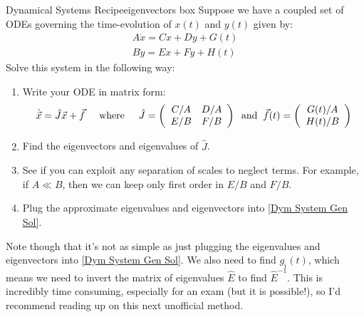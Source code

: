\begin{fact}{Dynamical Systems Recipe}{eigenvectors box}\label{eigenvectors box}
    Suppose we have a coupled set of ODEs governing the time-evolution of $x(t)$ and $y(t)$ given by:
    \begin{align*}
        A \dot{x}= Cx + Dy + G(t)\\
        B \dot{y} = Ex + Fy + H(t)
    \end{align*}
    Solve this system in the following way:
    \begin{enumerate}
        \item Write your ODE in matrix form:
            \begin{align*}
                \dot{\vec{x}}=\hat{J}\vec{x}+\vec{f} \hspace{5 mm}\text{where} \hspace{5 mm}\hat{J} = \left( \begin{array}{cc}
                    C/A & D/A \\
                    E/B & F/B
                \end{array} \right)
                \hspace{2 mm}\text{and} \hspace{2 mm}
                \vec{f}(t)=\left( \begin{array}{c}
                    G(t)/A \\
                    H(t)/B
                \end{array} \right)
            \end{align*}
        \item Find the eigenvectors and eigenvalues of $\hat{J}$.
        \item See if you can exploit any separation of scales to neglect terms. For example, if $A\ll B$, then we can keep only first order in $E/B$ and $F/B$. 
        \item Plug the approximate eigenvalues and eigenvectors into \ref{Dym System Gen Sol}.
    \end{enumerate}
\end{fact}

Note though that it's not as simple as just plugging the eigenvalues and eigenvectors into \ref{Dym System Gen Sol}. We also need to find $g_i(t)$, which means we need to invert the matrix of eigenvalues $\hat{E}$ to find $\hat{E}^{-1}$. This is incredibly time consuming, especially for an exam (but it is possible!), so I'd recommend reading up on this next unofficial method.

